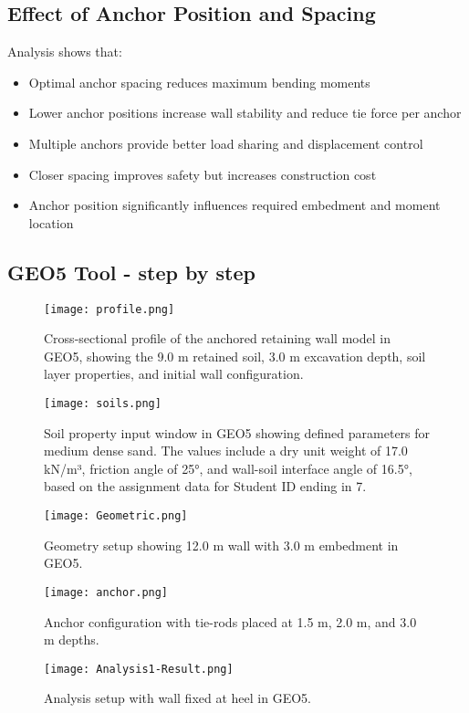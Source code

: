 \documentclass[10pt,a4paper,twocolumn]{article}
\begin{document}
\subsection{Effect of Anchor Position and Spacing}

Analysis shows that:
\begin{itemize}
\item Optimal anchor spacing reduces maximum bending moments
\item Lower anchor positions increase wall stability and reduce tie force per anchor
\item Multiple anchors provide better load sharing and displacement control
\item Closer spacing improves safety but increases construction cost
 \item Anchor position significantly influences required embedment and moment location


\end{itemize}

\subsection{GEO5 Tool - step by step}

\begin{figure}[H]
    \centering
    \texttt{[image: profile.png]}
    \caption{Cross-sectional profile of the anchored retaining wall model in GEO5, showing the 9.0 m retained soil, 3.0 m excavation depth, soil layer properties, and initial wall configuration.}
    \label{fig:moment_diagram}
\end{figure}

\begin{figure}[H]
    \centering
    \texttt{[image: soils.png]}
    \caption{Soil property input window in GEO5 showing defined parameters for medium dense sand. The values include a dry unit weight of 17.0 kN/m³, friction angle of 25°, and wall-soil interface angle of 16.5°, based on the assignment data for Student ID ending in 7.}
    \label{fig:soil_properties}
\end{figure}

\begin{figure}[H]
    \centering
    \texttt{[image: Geometric.png]}
    \caption{Geometry setup showing 12.0 m wall with 3.0 m embedment in GEO5.}
    \label{fig:wall_geometry}
\end{figure}

\begin{figure}[H]
    \centering
    \texttt{[image: anchor.png]}
    \caption{Anchor configuration with tie-rods placed at 1.5 m, 2.0 m, and 3.0 m depths.}
    \label{fig:anchor_setup}
\end{figure}
\begin{figure}[H]
    \centering
    \texttt{[image: Analysis1-Result.png]}
    \caption{Analysis setup with wall fixed at heel in GEO5.}
    \label{fig:wall_fixed_heel}
\end{figure}
\end{document}
